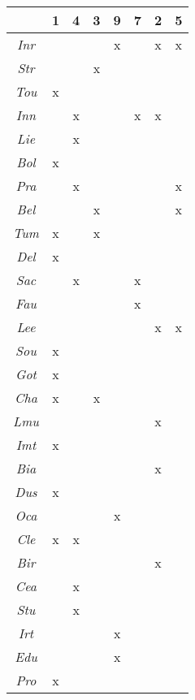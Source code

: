 \begin{center}
\begin{tabular}{|c|c|c|c|c|c|c|c|}
\hline
    & 1 & 4 & 3 & 9 & 7 & 2 & 5 \\
\hline
\textsl{Inr} &   &   &   & x &   & x & x \\
\hline
\textsl{Str} &   &   & x &   &   &   &   \\
\hline
\textsl{Tou} & x &   &   &   &   &   &   \\
\hline
\textsl{Inn} &   & x &   &   & x & x &   \\
\hline
\textsl{Lie} &   & x &   &   &   &   &   \\
\hline
\textsl{Bol} & x &   &   &   &   &   &   \\
\hline
\textsl{Pra} &   & x &   &   &   &   & x \\
\hline
\textsl{Bel} &   &   & x &   &   &   & x \\
\hline
\textsl{Tum} & x &   & x &   &   &   &   \\
\hline
\textsl{Del} & x &   &   &   &   &   &   \\
\hline
\textsl{Sac} &   & x &   &   & x &   &   \\
\hline
\textsl{Fau} &   &   &   &   & x &   &   \\
\hline
\textsl{Lee} &   &   &   &   &   & x & x \\
\hline
\textsl{Sou} & x &   &   &   &   &   &   \\
\hline
\textsl{Got} & x &   &   &   &   &   &   \\
\hline
\textsl{Cha} & x &   & x &   &   &   &   \\
\hline
\textsl{Lmu} &   &   &   &   &   & x &   \\
\hline
\textsl{Imt} & x &   &   &   &   &   &   \\
\hline
\textsl{Bia} &   &   &   &   &   & x &   \\
\hline
\textsl{Dus} & x &   &   &   &   &   &   \\
\hline
\textsl{Oca} &   &   &   & x &   &   &   \\
\hline
\textsl{Cle} & x & x &   &   &   &   &   \\
\hline
\textsl{Bir} &   &   &   &   &   & x &   \\
\hline
\textsl{Cea} &   & x &   &   &   &   &   \\
\hline
\textsl{Stu} &   & x &   &   &   &   &   \\
\hline
\textsl{Irt} &   &   &   & x &   &   &   \\
\hline
\textsl{Edu} &   &   &   & x &   &   &   \\
\hline
\textsl{Pro} & x &   &   &   &   &   &   \\
\hline
\end{tabular}
\end{center}

